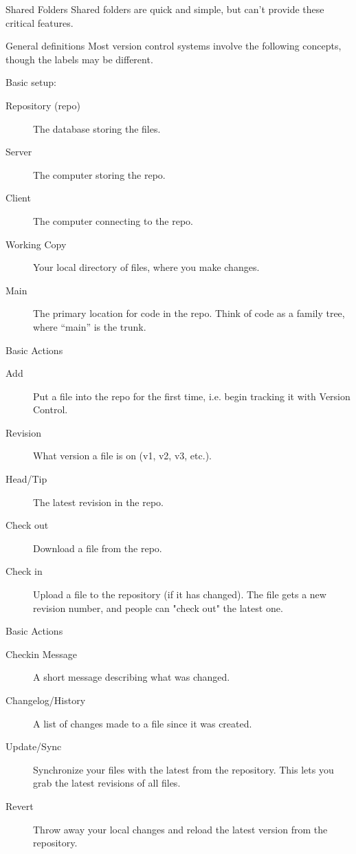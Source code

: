 \begin{frame}{Shared Folders}
Shared folders are quick and simple, but can't provide these critical
features.
\end{frame}

\begin{frame}{General definitions}
Most version control systems involve the following concepts, though the
labels may be different.

Basic setup:

\begin{description}
\item[Repository (repo)] The database storing the files.
\item[Server] The computer storing the repo.
\item[Client] The computer connecting to the repo.
\item[Working Copy] Your local directory of files,
  where you make changes.
\item[Main] The primary location for code in the repo.
  Think of code as a family tree, where ``main'' is the trunk.
\end{description}
\end{frame}

\begin{frame}{Basic Actions}
\begin{description}
\item[Add] Put a file into the repo for the first time, i.e.
  begin tracking it with Version Control.
\item[Revision] What version a file is on (v1, v2, v3, etc.).
\item[Head/Tip] The latest revision in the repo.
\item[Check out] Download a file from the repo.
\item[Check in] Upload a file to the repository (if it has
  changed). The file gets a new revision number, and people can "check
  out" the latest one.
\end{description}
\end{frame}
\begin{frame}{Basic Actions}
\begin{description}
\item[Checkin Message] A short message describing what was
  changed.
\item[Changelog/History] A list of changes made to a file since
  it was created.
\item[Update/Sync] Synchronize your files with the latest from
  the repository. This lets you grab the latest revisions of all files.
\item[Revert] Throw away your local changes and reload the latest
  version from the repository.
\end{description}
\end{frame}

